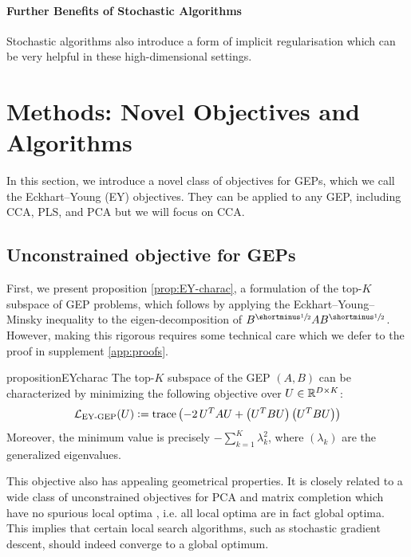 \paragraph{Further Benefits of Stochastic Algorithms}
Stochastic algorithms also introduce a form of implicit regularisation \citep{smith2021origin} which can be very helpful in these high-dimensional settings.


\section{Methods: Novel Objectives and Algorithms}\label{sec:contributions}

In this section, we introduce a novel class of objectives for GEPs, which we call the Eckhart--Young (EY) objectives.
They can be applied to any GEP, including CCA, PLS, and PCA but we will focus on CCA.

\subsection{Unconstrained objective for GEPs}\label{sec:gep-ey-formulation}
First, we present proposition \ref{prop:EY-charac}, a formulation of the top-$K$ subspace of GEP problems, which follows by applying the Eckhart--Young--Minsky inequality \citep{stewart_matrix_1990} to the eigen-decomposition of $B^\mhalf A B^\mhalf$. However, making this rigorous requires some technical care which we defer to the proof in supplement \ref{app:proofs}.

\begin{restatable}{proposition}{EYcharac}
    \label{prop:EY-charac}
    The top-$K$ subspace of the GEP $(A,B)$ can be characterized by minimizing the following objective over $U \in \mathbb{R}^{D \times K}$:
    \begin{align}\label{eq:EY-charac}
    \mathcal{L}_\text{EY-GEP}(U) \vcentcolon= \operatorname{trace} \left( - 2\,U^T A U + \left(U^T B U\right) \left(U^T B U\right) \right)
    \end{align}
    Moreover, the minimum value is precisely $- \sum_{k=1}^K \lambda_k^2$, where $(\lambda_k)$ are the generalized eigenvalues.
\end{restatable}

This objective also has appealing geometrical properties.
It is closely related to a wide class of unconstrained objectives for PCA and matrix completion which have no spurious local optima \citep{ge_no_2017}, i.e. all local optima are in fact global optima.
This implies that certain local search algorithms, such as stochastic gradient descent, should indeed converge to a global optimum.

